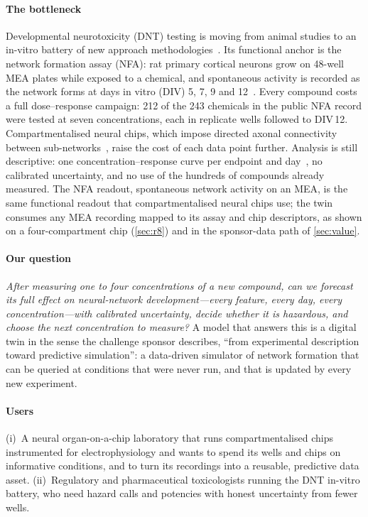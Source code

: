 \documentclass[11pt,a4paper]{article}
\newcommand{\nChem}{243}
\newcommand{\nSevenLv}{212}
\begin{document}
\paragraph{The bottleneck}
Developmental neurotoxicity (DNT) testing is moving from animal studies to an in-vitro battery of new
approach methodologies~\cite{oecd2023dnt,masjosthusmann2020establishment,carstens2022integrating}. Its
functional anchor is the network formation assay (NFA): rat primary cortical neurons grow on 48-well MEA
plates while exposed to a chemical, and spontaneous activity is recorded as the network forms at days
in vitro (DIV) 5, 7, 9 and 12~\cite{brown2016evaluation,frank2017developmental,shafer2019evaluation}.
Every compound costs a full dose--response campaign: \nSevenLv{} of the \nChem{} chemicals in the public NFA
record were tested at seven concentrations, each in replicate wells followed to DIV\,12.
Compartmentalised neural chips, which impose directed axonal connectivity between
sub-networks~\cite{brewer2013toward,narula2017narrow,courte2023synapses}, raise the cost of each data point further.
Analysis is still descriptive: one concentration--response curve per endpoint and
day~\cite{sheffield2022tcplfit2,carstens2026current}, no calibrated uncertainty, and no use of the hundreds of
compounds already measured. The NFA readout, spontaneous network activity on an MEA, is the same functional
readout that compartmentalised neural chips use; the twin consumes any MEA recording mapped to its assay and chip
descriptors, as shown on a four-compartment chip (\cref{sec:r8}) and in the sponsor-data path of \cref{sec:value}.

\paragraph{Our question}
\emph{After measuring one to four concentrations of a new compound, can we forecast its full effect on
neural-network development---every feature, every day, every concentration---with calibrated uncertainty,
decide whether it is hazardous, and choose the next concentration to measure?} A model that answers this is a
digital twin in the sense the challenge sponsor describes, ``from experimental description toward predictive
simulation'': a data-driven simulator of network formation that can be queried at conditions that were never
run, and that is updated by every new experiment.

\paragraph{Users}
(i)~A neural organ-on-a-chip laboratory that runs compartmentalised chips instrumented for electrophysiology and
wants to spend its wells and chips on informative conditions, and to turn its recordings into a reusable,
predictive data asset. (ii)~Regulatory and pharmaceutical toxicologists running the DNT in-vitro battery, who
need hazard calls and potencies with honest uncertainty from fewer wells.
\end{document}
